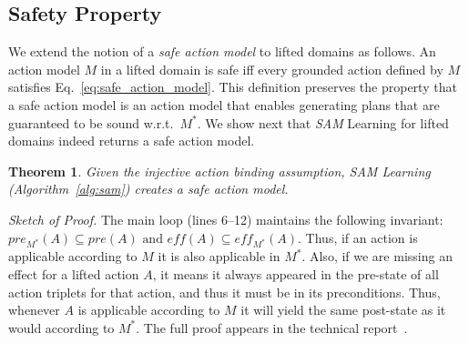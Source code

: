 \documentclass{article}
\newtheorem{theorem}{Theorem}
\newcommand{\pre}{\textit{pre}}
\newcommand{\eff}{\textit{eff}}
\newcommand{\realm}{\ensuremath{M^*}\xspace}
\newcommand{\lifta}{A}
\newcommand{\sam}{\textit{SAM}\xspace}
\begin{document}
\subsection{Safety Property}

We extend the notion of a \emph{safe action model} to lifted domains as follows. An action model $M$ in a lifted domain is safe iff 
every grounded action defined by $M$ satisfies Eq.~\ref{eq:safe_action_model}. 
This definition preserves the property that a safe action model is an action model that enables generating plans that are guaranteed to be sound w.r.t.\ $\realm$. 
We show next that \sam Learning for lifted domains indeed returns a safe action model. 





\begin{theorem}\label{safe-sam-thm}
Given the injective action binding assumption,
SAM Learning (Algorithm~\ref{alg:sam}) creates a safe action model. 
\end{theorem}
\noindent
\emph{Sketch of Proof.} 
The main loop (lines 6--12) maintains the following invariant:
$
    \pre_{\realm}(\lifta)\subseteq\pre(\lifta) \text{ and }
\eff(\lifta)\subseteq\eff_{\realm}(\lifta).
$
Thus, if an action is applicable according to $M$ it is also applicable in $\realm$. 
Also, if we are missing an effect for a lifted action $\lifta$, it means it always appeared in the pre-state of all action triplets for that action, and thus it must be in its preconditions. 
Thus, whenever $\lifta$ is applicable according to $M$ it will yield the same post-state as it would according to $\realm$. 
The full proof appears in the 
technical report~\cite{juba2021arxiv}.



\end{document}
